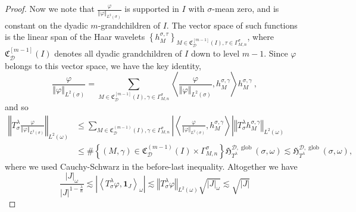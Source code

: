 \documentclass{amsart}%
\theoremstyle{plain}
\numberwithin{equation}{section}
\begin{document}
\begin{proof}
Now we note that $\frac{\varphi}{\left\Vert \varphi\right\Vert _{L^{2}\left(
\sigma\right)  }}$ is supported in $I$ with $\sigma$-mean zero, and is
constant on the dyadic $m$-grandchildren of $I$. The vector space of
such functions is the linear span of the Haar wavelets $\left\{  h_{M}%
^{\sigma,\tau}\right\}  _{M\in\mathfrak{C}_{\mathcal{D}}^{\left[  m-1\right]
}\left(  I\right)  ,\tau\in\Gamma_{M,n}^{\sigma}}$, where $\mathfrak{C}%
_{\mathcal{D}}^{\left[  m-1\right]  }\left(  I\right)  $ denotes all dyadic
grandchildren of $I$ down to level $m-1$. Since $\varphi$ belongs to this
vector space, we have the key identity,%
\begin{equation}
\frac{\varphi}{\left\Vert \varphi\right\Vert _{L^{2}\left(  \sigma\right)  }%
}=\sum_{M\in\mathfrak{C}_{\mathcal{D}}^{\left[  m-1\right]  }\left(  I\right)
,\gamma\in\Gamma_{M,n}^{\sigma}}\left\langle \frac{\varphi}{\left\Vert
\varphi\right\Vert _{L^{2}\left(  \sigma\right)  }},h_{M}^{\sigma,\gamma
}\right\rangle h_{M}^{\sigma,\gamma}\ ,\label{key identity}%
\end{equation}
and so%
\begin{align}
\left\Vert T_{\sigma}^{\lambda}\frac{\varphi}{\left\Vert \varphi\right\Vert
_{L^{2}\left(  \sigma\right)  }}\right\Vert _{L^{2}\left(  \omega\right)  } &
\leq\sum_{M\in\mathfrak{C}_{\mathcal{D}}^{\left(  m-1\right)  }\left(
I\right)  ,\gamma\in\Gamma_{M,n}^{\sigma}}\left\vert \left\langle
\frac{\varphi}{\left\Vert \varphi\right\Vert _{L^{2}\left(  \sigma\right)  }%
},h_{M}^{\sigma,\gamma}\right\rangle \right\vert \left\Vert T_{\sigma
}^{\lambda}h_{M}^{\sigma,\gamma}\right\Vert _{L^{2}\left(  \omega\right)
}\label{eq:phi_Haar_testing}\\
&  \leq\#\left\{  \left(  M,\gamma\right)  \in\mathfrak{C}_{\mathcal{D}%
}^{\left(  m-1\right)  }\left(  I\right)  \times\Gamma_{M,n}^{\sigma}\right\}
\mathfrak{H}_{T^{\lambda}}^{\mathcal{D},\operatorname*{glob}}\left(
\sigma,\omega\right)  \lesssim\mathfrak{H}_{T^{\lambda}}^{\mathcal{D}%
,\operatorname*{glob}}\left(  \sigma,\omega\right)  ,\nonumber
\end{align}
where we used Cauchy-Schwarz in the before-last inequality. Altogether we have%
\[
\frac{\left\vert J\right\vert _{\omega}}{\left\vert J\right\vert
^{1-\frac{\lambda}{n}}}\lesssim\left\vert \left\langle T_{\sigma}^{\lambda
}\varphi,\mathbf{1}_{J}\right\rangle _{\omega}\right\vert \lesssim\left\Vert
T_{\sigma}^{\lambda}\varphi\right\Vert _{L^{2}\left(  \omega\right)  }%
\sqrt{\left\vert J\right\vert _{\omega}}\lesssim\sqrt{\left\vert J\right\vert
}\]
\end{proof}
\end{document}
